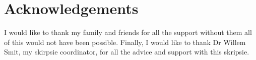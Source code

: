 \chapter*{Acknowledgements}
\makeatletter{}\makeatother

I would like to thank my family and friends for all the support without them all of this would not have been possible. Finally, I would like to thank Dr Willem Smit, my skirpsie coordinator, for all the advice and support with this skripsie.